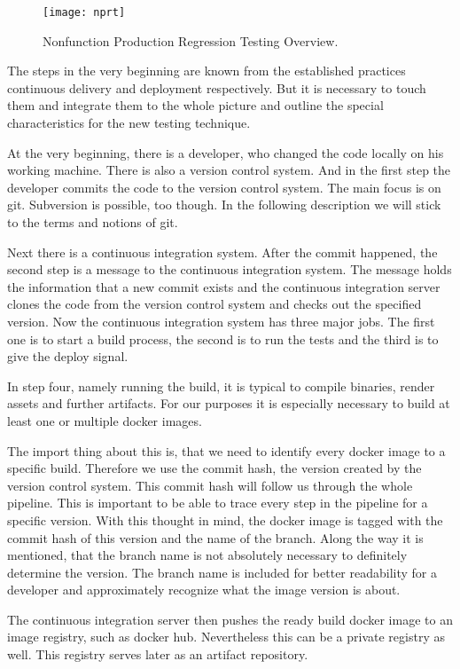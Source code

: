 \begin{figure}[htbp]
	\centering
	\texttt{[image: nprt]}
	\caption[GMF Dashboard View]{Nonfunction Production Regression Testing Overview.}
	\label{fig:nprt}
\end{figure}

The steps in the very beginning are known from the established practices continuous delivery and deployment respectively. But it is necessary to touch them and integrate them to the whole picture and outline the special characteristics for the new testing technique.

At the very beginning, there is a developer, who changed the code locally on his working machine. There is also a version control system. And in the first step the developer commits the code to the version control system. The main focus is on git. Subversion is possible, too though. In the following description we will stick to the terms and notions of git.

Next there is a continuous integration system. After the commit happened, the second step is a message to the continuous integration system. The message holds the information that a new commit exists and the continuous integration server clones the code from the version control system and checks out the specified version. Now the continuous integration system has three major jobs. The first one is to start a build process, the second is to run the tests and the third is to give the deploy signal.

In step four, namely running the build, it is typical to compile binaries, render assets and further artifacts. For our purposes it is especially necessary to build at least one or multiple docker images.

The import thing about this is, that we need to identify every docker image to a specific build. Therefore we use the commit hash, the version created by the version control system. This commit hash will follow us through the whole pipeline. This is important to be able to trace every step in the pipeline for a specific version. With this thought in mind, the docker image is tagged with the commit hash of this version and the name of the branch. Along the way it is mentioned, that the branch name is not absolutely necessary to definitely determine the version. The branch name is included for better readability for a developer and approximately recognize what the image version is about.

The continuous integration server then pushes the ready build docker image to an image registry, such as docker hub. Nevertheless this can be a private registry as well. This registry serves later as an artifact repository.

